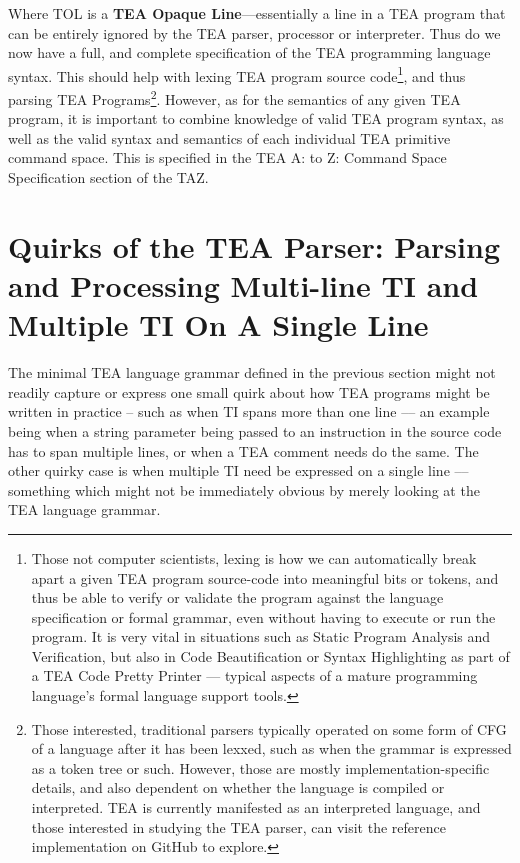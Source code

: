 \documentclass[a4paper, 18pt]{book} %
\begin{document}
Where TOL is a \textbf{TEA Opaque Line}---essentially a line in a TEA program that can be entirely ignored by the TEA parser, processor or interpreter. Thus do we now have a full, and complete specification of the TEA programming language syntax. This should help with lexing TEA program source code\footnote{Those not computer scientists, lexing is how we can automatically break apart a given TEA program source-code into meaningful bits or tokens, and thus be able to verify or validate the program against the language specification or formal grammar, even without having to execute or run the program. It is very vital in situations such as Static Program Analysis and Verification, but also in Code Beautification or Syntax Highlighting as part of a TEA Code Pretty Printer --- typical aspects of a mature programming language's formal language support tools.}, and thus parsing TEA Programs\footnote{Those interested, traditional parsers typically operated on some form of CFG of a language after it has been lexxed, such as when the grammar is expressed as a token tree or such. However, those are mostly implementation-specific details, and also dependent on whether the language is compiled or interpreted. TEA is currently manifested as an interpreted language, and those interested in studying the TEA parser, can visit the reference implementation on GitHub\cite{cli_tttt} to explore.}. However, as for the semantics of any given TEA program, it is important to combine knowledge of valid TEA program syntax, as well as the valid syntax and semantics of each individual TEA primitive command space. This is specified in the TEA A: to Z: Command Space Specification section of the TAZ.

\section{Quirks of the TEA Parser: Parsing and Processing Multi-line TI and Multiple TI On A Single Line}
\label{SECPARSE}

The minimal TEA language grammar defined in the previous section might not readily capture or express one small quirk about how TEA programs might be written in practice – such as when TI spans more than one line --– an example being when a string parameter being passed to an instruction in the source code has to span multiple lines, or when a TEA comment needs do the same. The other quirky case is when multiple TI need be expressed on a single line –-- something which might not be immediately obvious by merely looking at the TEA language grammar.
\end{document}
